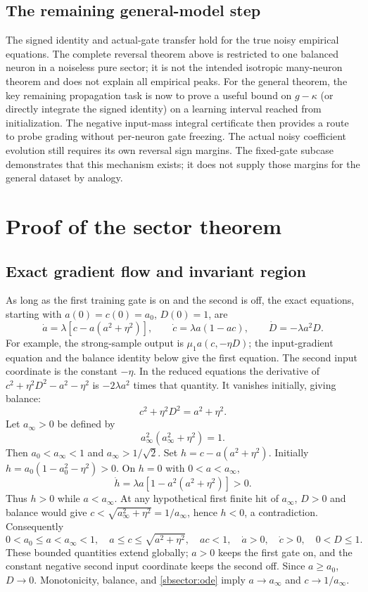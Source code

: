 \documentclass{article} %
\theoremstyle{plain}
\theoremstyle{definition}
\theoremstyle{remark}
\begin{document}
\subsection{The remaining general-model step}
The signed identity and actual-gate transfer hold for the true noisy
empirical equations. The complete reversal theorem above is restricted
to one balanced neuron in a noiseless pure sector; it is not the intended
isotropic many-neuron theorem and does not explain all empirical peaks.
For the general theorem, the key remaining propagation task is now to
prove a useful bound on $g-\kappa$ (or directly integrate the signed
identity) on a learning interval reached from initialization. The negative
input-mass integral certificate then provides a route to probe grading
without per-neuron gate freezing. The actual noisy coefficient evolution
still requires its own reversal sign margins. The fixed-gate subcase
demonstrates that this mechanism exists; it does not supply those margins
for the general dataset by analogy.

\section{Proof of the sector theorem}
\label{sbsector:proof}

\subsection{Exact gradient flow and invariant region}
As long as the first training gate is on and the second is off,
the exact equations, starting with $a(0)=c(0)=a_0$, $D(0)=1$, are
\begin{equation}\label{sbsector:ode}
 \dot a=\lambda[c-a(a^2+\eta^2)],\qquad
 \dot c=\lambda a(1-ac),\qquad
 \dot D=-\lambda a^2D.
\end{equation}
For example, the strong-sample output is $\mu_1a(c,-\eta D)$;
the input-gradient equation and the balance identity below give the
first equation. The second input coordinate is the constant $-\eta$.
In the reduced equations the derivative of
$c^2+\eta^2D^2-a^2-\eta^2$ is $-2\lambda a^2$ times that quantity.
It vanishes initially, giving balance:
\begin{equation}\label{sbsector:balance}
 c^2+\eta^2D^2=a^2+\eta^2.
\end{equation}
Let $a_\infty>0$ be defined by
\[
 a_\infty^2(a_\infty^2+\eta^2)=1.
\]
Then $a_0<a_\infty<1$ and $a_\infty>1/\sqrt2$.
Set $h=c-a(a^2+\eta^2)$. Initially $h=a_0(1-a_0^2-\eta^2)>0$.
On $h=0$ with $0<a<a_\infty$,
\[
 \dot h=\lambda a[1-a^2(a^2+\eta^2)]>0.
\]
Thus $h>0$ while $a<a_\infty$. At any hypothetical first finite hit
of $a_\infty$, $D>0$ and balance would give
$c<\sqrt{a_\infty^2+\eta^2}=1/a_\infty$, hence $h<0$, a contradiction.
Consequently
\[
 0<a_0\le a<a_\infty<1,\quad
 a\le c\le\sqrt{a^2+\eta^2},\quad ac<1,\quad
 \dot a>0,\quad\dot c>0,\quad 0<D\le1.
\]
These bounded quantities extend globally; $a>0$ keeps the first gate on,
and the constant negative second input coordinate keeps the second off.
Since $a\ge a_0$, $D\to0$. Monotonicity, balance, and
\eqref{sbsector:ode} imply $a\to a_\infty$ and $c\to1/a_\infty$.
\end{document}
